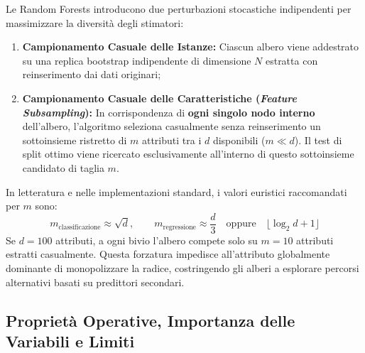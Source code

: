 \begin{definition}
Le Random Forests introducono due perturbazioni stocastiche indipendenti per massimizzare la diversità degli stimatori:
\begin{enumerate}
    \item \textbf{Campionamento Casuale delle Istanze:} Ciascun albero viene addestrato su una replica bootstrap indipendente di dimensione $N$ estratta con reinserimento dai dati originari;
    \item \textbf{Campionamento Casuale delle Caratteristiche (\textit{Feature Subsampling}):} In corrispondenza di \textbf{ogni singolo nodo interno} dell'albero, l'algoritmo seleziona casualmente senza reinserimento un sottoinsieme ristretto di $m$ attributi tra i $d$ disponibili ($m \ll d$). Il test di split ottimo viene ricercato esclusivamente all'interno di questo sottoinsieme candidato di taglia $m$.
\end{enumerate}
\end{definition}

In letteratura e nelle implementazioni standard, i valori euristici raccomandati per $m$ sono:
\begin{equation}
    m_{\text{classificazione}} \approx \sqrt{d}, \qquad m_{\text{regressione}} \approx \frac{d}{3} \quad \text{oppure} \quad \lfloor \log_2 d + 1 \rfloor
\end{equation}
Se $d = 100$ attributi, a ogni bivio l'albero compete solo su $m = 10$ attributi estratti casualmente. Questa forzatura impedisce all'attributo globalmente dominante di monopolizzare la radice, costringendo gli alberi a esplorare percorsi alternativi basati su predittori secondari.

\FloatBarrier
\subsection{Proprietà Operative, Importanza delle Variabili e Limiti}
\label{subsec:dm-rf-properties}

